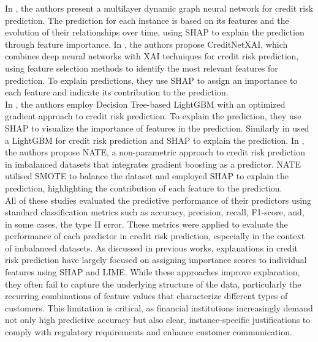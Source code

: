 {    %

    In \cite{zandi2025attention}, the authors present a multilayer dynamic graph neural network for credit risk prediction. The prediction for each instance is based on its features and the evolution of their relationships over time, using SHAP to explain the prediction through feature importance. In \cite{talaat2024toward}, the authors propose CreditNetXAI, which combines deep neural networks with XAI techniques for credit risk prediction, using feature selection methods to identify the most relevant features for prediction. To explain predictions, they use SHAP to assign an importance to each feature and indicate its contribution to the prediction.\\ 

    In \cite{zheng2024micro}, the authors employ Decision Tree-based LightGBM with an optimized gradient approach to credit risk prediction. To explain the prediction, they use SHAP to visualize the importance of features in the prediction. Similarly in \cite{de2022explainable} used a LightGBM for credit risk prediction and SHAP to explain the prediction. In \cite{han2024nate}, the authors propose NATE, a non-parametric approach to credit risk prediction in imbalanced datasets that integrates gradient boosting as a predictor. NATE utilised SMOTE to balance the dataset and employed SHAP to explain the prediction, highlighting the contribution of each feature to the prediction.\\

    All of these studies evaluated the predictive performance of their predictors using standard classification metrics such as accuracy, precision, recall, F1-score, and, in some cases, the type II error. These metrics were applied to evaluate the performance of each predictor in credit risk prediction, especially in the context of imbalanced datasets. As discussed in previous works, explanations in credit risk prediction have largely focused on assigning importance scores to individual features using SHAP and LIME. While these approaches improve explanation, they often fail to capture the underlying structure of the data, particularly the recurring combinations of feature values that characterize different types of customers. This limitation is critical, as financial institutions increasingly demand not only high predictive accuracy but also clear, instance-specific justifications to comply with regulatory requirements and enhance customer communication.\\

}

